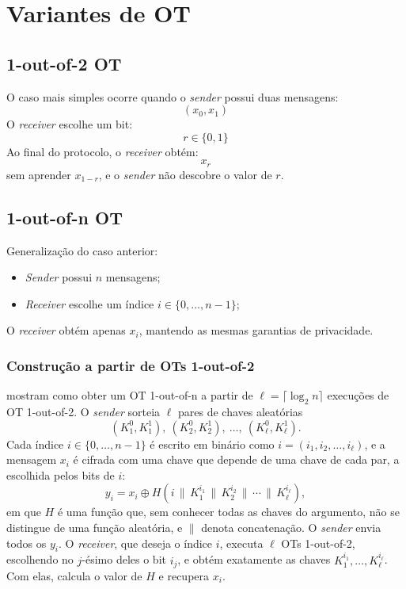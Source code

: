 \section{Variantes de OT}

\subsection{1-out-of-2 OT}

O caso mais simples ocorre quando o \emph{sender} possui duas mensagens:
\[
(x_0, x_1)
\]
O \emph{receiver} escolhe um bit:
\[
r \in \{0, 1\}
\]
Ao final do protocolo, o \emph{receiver} obtém:
\[
x_r
\]
sem aprender $x_{1-r}$, e o \emph{sender} não descobre o valor de $r$.

\subsection{1-out-of-n OT}

Generalização do caso anterior:

\begin{itemize}
\item \emph{Sender} possui $n$ mensagens;
\item \emph{Receiver} escolhe um índice $i \in \{0, \ldots, n-1\}$;
\end{itemize}

O \emph{receiver} obtém apenas $x_i$, mantendo as mesmas garantias de
privacidade.

\subsubsection{Construção a partir de OTs 1-out-of-2}

 mostram como obter um OT 1-out-of-n a partir de
$\ell = \lceil \log_2 n \rceil$ execuções de OT 1-out-of-2. O \emph{sender}
sorteia $\ell$ pares de chaves aleatórias
\[
(K_1^0, K_1^1),\ (K_2^0, K_2^1),\ \ldots,\ (K_\ell^0, K_\ell^1).
\]
Cada índice $i \in \{0, \ldots, n-1\}$ é escrito em binário como
$i = (i_1, i_2, \ldots, i_\ell)$, e a mensagem $x_i$ é cifrada com uma chave
que depende de uma chave de cada par, a escolhida pelos bits de $i$:
\[
y_i = x_i \oplus H\!\left(i \,\|\, K_1^{i_1} \,\|\, K_2^{i_2} \,\|\, \cdots \,\|\, K_\ell^{i_\ell}\right),
\]
em que $H$ é uma função que, sem conhecer todas as chaves do argumento, não se
distingue de uma função aleatória, e $\|$ denota concatenação. O
\emph{sender} envia todos os $y_i$. O \emph{receiver}, que deseja o índice
$i$, executa $\ell$ OTs 1-out-of-2, escolhendo no $j$-ésimo deles o bit $i_j$,
e obtém exatamente as chaves $K_1^{i_1}, \ldots, K_\ell^{i_\ell}$. Com elas,
calcula o valor de $H$ e recupera $x_i$.

